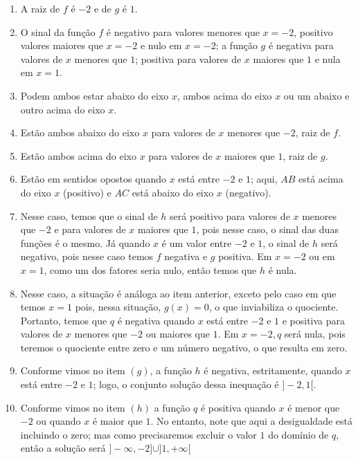 \documentclass[10 pt,usenames,dvipsnames, oneside]{article}
\begin{document}
\ifdefined\prof
\begin{solucao}

\begin{enumerate}
\item A raiz de $f$ é $-2$ e de $g$ é $1$.
\item O sinal da função $f$ é negativo para valores menores que  $x=-2$, positivo valores maiores que $x=-2$ e nulo em $x=-2$;  a função $g$ é negativa para valores de $x$ menores que $1$; positiva para valores de $x$ maiores que $1$ e nula em $x = 1$.
\item Podem ambos estar abaixo do eixo $x$, ambos acima do eixo $x$ ou um abaixo e outro acima do eixo $x$.
\item Estão ambos abaixo do eixo $x$ para valores de $x$ menores que $-2$, raiz de $f$.
\item Estão ambos acima do eixo $x$ para valores de $x$ maiores que $1$, raiz de $g$.
\item Estão em sentidos opostos quando $x$ está entre $-2$ e $1$; aqui, $AB$ está acima do eixo $x$ (positivo) e $AC$ está abaixo do eixo $x$ (negativo).
\item Nesse caso, temos que o sinal de $h$ será positivo para valores de $x$ menores que $-2$ e para valores de $x$ maiores que $1$, pois nesse caso, o sinal das duas funções é o mesmo. Já quando $x$ é um valor entre $-2$ e $1$, o sinal de $h$ será negativo, pois nesse caso temos $f$ negativa e $g$ positiva. Em $x = -2$ ou em $x = 1$, como um dos fatores seria nulo, então temos que $h$ é nula.
\item Nesse caso, a situação é análoga ao item anterior, exceto pelo caso em que temos $x=1$ pois, nessa situação, $g(x)=0$, o que inviabiliza o quociente. Portanto, temos que $q$ é negativa quando $x$ está entre $-2$ e $1$ e positiva para valores de $x$ menores que $-2$ ou maiores que $1$. Em $x=-2, q$ será nula, pois teremos o quociente entre zero e um número negativo, o que resulta em zero.
\item Conforme vimos no item $(g)$, a função $h$ é negativa, estritamente, quando $x$ está entre $-2$ e $1$; logo, o conjunto solução dessa inequação é $]-2,1[$.
\item  Conforme vimos no item $(h)$ a função $q$ é positiva quando $x$ é menor que $-2$ ou quando $x$ é maior que $1$. No entanto, note que aqui a desigualdade está incluindo o zero; mas como precisaremos excluir o valor $1$ do domínio de $q$, então a solução será $]-\infty, -2]\cup ]1,+\infty[$
\end{enumerate}

\end{solucao}
\fi
\end{document}
